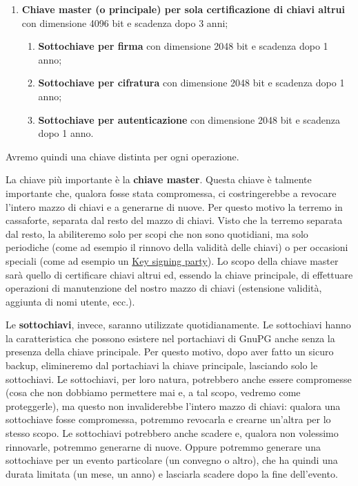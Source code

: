 \documentclass[a4paper,10pt]{article}
\begin{document}
\begin{enumerate}
 \item \textbf{Chiave master (o principale) per sola certificazione di chiavi altrui} con dimensione 4096 bit e scadenza dopo 3 anni;
 \begin{enumerate}
  \item \textbf{Sottochiave per firma} con dimensione 2048 bit e scadenza dopo 1 anno;
   \item \textbf{Sottochiave per cifratura} con dimensione 2048 bit e scadenza dopo 1 anno;
   \item \textbf{Sottochiave per autenticazione} con dimensione 2048 bit e scadenza dopo 1 anno.
 \end{enumerate}
\end{enumerate}

Avremo quindi una chiave distinta per ogni operazione.

La chiave più importante è la \textbf{chiave master}. Questa chiave è talmente importante che, qualora fosse stata compromessa, ci costringerebbe a revocare l'intero mazzo di chiavi e a generarne di nuove. Per questo motivo la terremo in cassaforte, separata dal resto del mazzo di chiavi. Visto che la terremo separata dal resto, la abiliteremo solo per scopi che non sono quotidiani, ma solo periodiche (come ad esempio il rinnovo della validità delle chiavi) o per occasioni speciali (come ad esempio un \href{https://it.wikipedia.org/wiki/Key_signing_party}{Key signing party}). Lo scopo della chiave master sarà quello di certificare chiavi altrui ed, essendo la chiave principale, di effettuare operazioni di manutenzione del nostro mazzo di chiavi (estensione validità, aggiunta di nomi utente, ecc.).

Le \textbf{sottochiavi}, invece, saranno utilizzate quotidianamente. Le sottochiavi hanno la caratteristica che possono esistere nel portachiavi di GnuPG anche senza la presenza della chiave principale. Per questo motivo, dopo aver fatto un sicuro backup, elimineremo dal portachiavi la chiave principale, lasciando solo le sottochiavi. Le sottochiavi, per loro natura, potrebbero anche essere compromesse (cosa che non dobbiamo permettere mai e, a tal scopo, vedremo come proteggerle), ma questo non invaliderebbe l'intero mazzo di chiavi: qualora una sottochiave fosse compromessa, potremmo revocarla e crearne un'altra per lo stesso scopo. Le sottochiavi potrebbero anche scadere e, qualora non volessimo rinnovarle, potremmo generarne di nuove. Oppure potremmo generare una sottochiave per un evento particolare (un convegno o altro), che ha quindi una durata limitata (un mese, un anno) e lasciarla scadere dopo la fine dell'evento.
\end{document}
